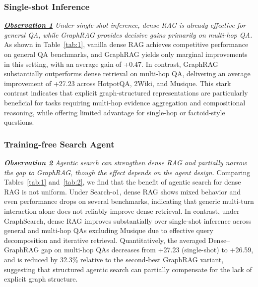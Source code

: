 \subsubsection{Single-shot Inference}
\textbf{\textit{\underline{Observation 1}}} \textit{Under single-shot inference, dense RAG is already effective for general QA, while GraphRAG provides decisive gains primarily on multi-hop QA. } As shown in Table~\ref{tab:1}, vanilla dense RAG achieves competitive performance on general QA benchmarks, and GraphRAG yields only marginal improvements in this setting, with an average gain of +0.47. In contrast, GraphRAG substantially outperforms dense retrieval on multi-hop QA, delivering an average improvement of +27.23 across HotpotQA, 2Wiki, and Musique. This stark contrast indicates that explicit graph-structured representations are particularly beneficial for tasks requiring multi-hop evidence aggregation and compositional reasoning, while offering limited advantage for single-hop or factoid-style questions.
\subsubsection{Training-free Search Agent}
\textbf{\textit{\underline{Observation 2}}}
\textit{Agentic search can strengthen dense RAG and partially narrow the gap to GraphRAG, though the effect depends on the agent design.} Comparing Tables~\ref{tab:1} and~\ref{tab:2}, we find that the benefit of agentic search for dense RAG is not uniform. Under Search-o1, dense RAG shows mixed behavior and even performance drops on several benchmarks, indicating that generic multi-turn interaction alone does not reliably improve dense retrieval. In contrast, under GraphSearch, dense RAG improves substantially over single-shot inference across general and multi-hop QAs excluding Musique due to effective query decomposition and iterative retrieval. Quantitatively, the averaged Dense–GraphRAG gap on multi-hop QAs decreases from +27.23 (single-shot) to +26.59, and is reduced by 32.3\% relative to the second-best GraphRAG variant, suggesting that structured agentic search can partially compensate for the lack of explicit graph structure.

